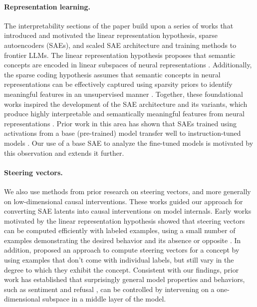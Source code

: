 \paragraph{Representation learning.}
The interpretability sections of the paper build upon a series of works that introduced and motivated the linear representation hypothesis, sparse autoencoders (SAEs), and scaled SAE architecture and training methods to frontier LLMs. The linear representation hypothesis proposes that semantic concepts are encoded in linear subspaces of neural representations \citep{mikolov2013linguistic}. Additionally, the sparse coding hypothesis assumes that semantic concepts in neural representations can be effectively captured using sparsity priors to identify meaningful features in an unsupervised manner \citep{olshausen1997sparse, arora2018linearalgebraicstructureword, elhage2022toymodelssuperposition}. Together, these foundational works inspired the development of the SAE architecture and its variants, which produce highly interpretable and semantically meaningful features from neural representations \citep{cunningham2023sparseautoencodershighlyinterpretable, bricken2023towards,gao2024scalingevaluatingsparseautoencoders, templeton2024scaling, rajamanoharan2024improvingdictionarylearninggated, rajamanoharan2024jumpingaheadimprovingreconstruction}. Prior work in this area has shown that SAEs trained using activations from a base (pre-trained) model transfer well to instruction-tuned models \citep{lieberum2024gemmascopeopensparse}. Our use of a base SAE to analyze the fine-tuned models is motivated by this observation and extends it further. 

\paragraph{Steering vectors.}
We also use methods from prior research on steering vectors, and more generally on low-dimensional causal interventions. These works guided our approach for converting SAE latents into causal interventions on model internals. Early works motivated by the linear representation hypothesis showed that steering vectors can be computed efficiently with labeled examples, using a small number of examples demonstrating the desired behavior and its absence or opposite \citep{turner2024steeringlanguagemodelsactivation, panickssery2024steeringllama2contrastive}. In addition, \citep{zou2025representationengineeringtopdownapproach} proposed an approach to compute steering vectors for a concept by using examples that don't come with individual labels, but still vary in the degree to which they exhibit the concept. Consistent with our findings, prior work has established that surprisingly general model properties and behaviors, such as sentiment \citep{radford2017learninggeneratereviewsdiscovering,tigges2023linearrepresentationssentimentlarge} and refusal \citep{arditi2024refusallanguagemodelsmediated}, can be controlled by intervening on a one-dimensional subspace in a middle layer of the model. 

